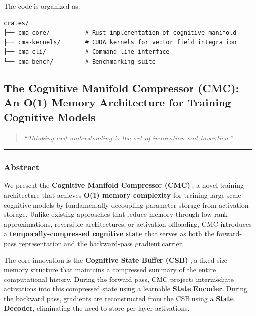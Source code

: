 \documentclass[
  11pt,
  a4paper,
]{article}
\begin{document}
The code is organized as:

\begin{verbatim}
crates/
├── cma-core/          # Rust implementation of cognitive manifold
├── cma-kernels/       # CUDA kernels for vector field integration
├── cma-cli/           # Command-line interface
└── cma-bench/         # Benchmarking suite
\end{verbatim}

\newpage

\subsection{The Cognitive Manifold Compressor (CMC): An O(1) Memory
Architecture for Training Cognitive
Models}\label{the-cognitive-manifold-compressor-cmc-an-o1-memory-architecture-for-training-cognitive-models}

\begin{quote}
\emph{``Thinking and understanding is the art of innovation and
invention.''}
\end{quote}

\begin{center}\rule{0.5\linewidth}{0.5pt}\end{center}

\subsubsection{Abstract}\label{abstract-4}

We present the \textbf{Cognitive Manifold Compressor (CMC)} , a novel
training architecture that achieves \textbf{O(1) memory complexity} for
training large-scale cognitive models by fundamentally decoupling
parameter storage from activation storage. Unlike existing approaches
that reduce memory through low-rank approximations, reversible
architectures, or activation offloading, CMC introduces a
\textbf{temporally-compressed cognitive state} that serves as both the
forward-pass representation and the backward-pass gradient carrier.

The core innovation is the \textbf{Cognitive State Buffer (CSB)} , a
fixed-size memory structure that maintains a compressed summary of the
entire computational history. During the forward pass, CMC projects
intermediate activations into this compressed state using a learnable
\textbf{State Encoder}. During the backward pass, gradients are
reconstructed from the CSB using a \textbf{State Decoder}, eliminating
the need to store per-layer activations.
\end{document}
